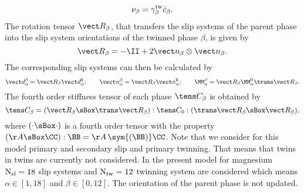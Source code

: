   \begin{equation}
      \nu_{\beta} = \gamma^{\rm tw}_{\beta} \dot{c}_{\beta}.
      \label{eq:nub}
  \end{equation}
  The rotation tensor $\RRb$, that transfers the slip systems of the parent phase into the slip system orientations of the twinned phase $\beta$, is given by
  \begin{equation}
      \RRb = -\II + 2\nnb \otimes \nnb.
      \label{eq:RRb}
  \end{equation}
  The corresponding slip systems can then be calculated by
  \begin{equation}
      \ddab = \RRb \dda^0; \qquad \nnab = \RRb \nna^0; \qquad \MMab = \RRb \MMa^0 \RRbT.
      \label{eq:MMab}
  \end{equation}
  The fourth order stiffness tensor of each phase $\CCCCb$ is obtained by
  \begin{equation}
    \CCCCb = (\RRb \sBox \RRbT) : \CCCC_0 : (\RRbT \sBox \RRb), 
    \label{eq:CCCCb}
  \end{equation}
  where $(\cdot \sBox \cdot)$ is a fourth order tensor with the property $(\AA \sBox \CC) : \BB=\AA \,\sym{(\BB)} \CC$. Note that we consider for this model primary and secondary slip and primary twinning. That means that twins in twins are currently not considered. In the present model for magnesium \mbox{${\rm N_{sl}}=18$} slip systems and \mbox{${\rm N_{tw}}=12$} twinning system are considered which means \mbox{$\alpha\in[1,18]$} and \mbox{$\beta\in[0,12]$}. The orientation of the parent phase is not updated. 


